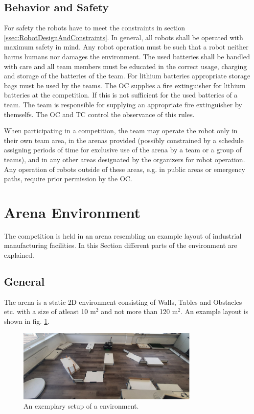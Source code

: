 \subsection{Behavior and Safety} \label{ssec:RobotBehaviorAndSafety}
For safety the robots have to meet the constraints in section \ref{ssec:RobotDesignAndConstraints}. In general, all robots shall be operated with maximum safety in mind. Any robot operation must be such that a robot neither harms humans nor damages the environment. 
The used batteries shall be handled with care and all team members must be educated in the correct usage, charging and storage of the batteries of the team. For lithium batteries appropriate storage bags must be used by the teams. The OC supplies a fire extinguisher for lithium batteries at the competition. If this is not sufficient for the used batteries of a team. The team is responsible for supplying an appropriate fire extinguisher by themselfs. The OC and TC control the observance of this rules.

When participating in a competition, the team may operate the robot only in their own team area, in the arenas provided (possibly constrained by a schedule assigning periods of time for exclusive use of the arena by a team or a group of teams), and in any other areas designated by the organizers for robot operation. Any operation of robots outside of these areas, e.g. in public areas or emergency paths, require prior permission by the OC.

\clearpage

\section{Arena Environment}
\label{sec:ArenaDesign}
The competition is held in an arena resembling an example layout of industrial manufacturing facilities. In this Section different parts of the environment are explained.
\subsection{General}
\label{ssec:ArenaGeneral}

The arena is a static 2D environment consisting of Walls, Tables and Obstacles etc. with a size of atleast 10 m$^2$ and not more than 120 m$^2$. 
An example layout is shown in fig. \ref{fig:arena_example}.

\begin{figure} [h!]
\centering
\includegraphics[width= 0.8\textwidth ]{./images/general_rules/arena_example.jpg}
\caption{An exemplary setup of a \RCAW environment.}
\label{fig:arena_example}
\end{figure}

